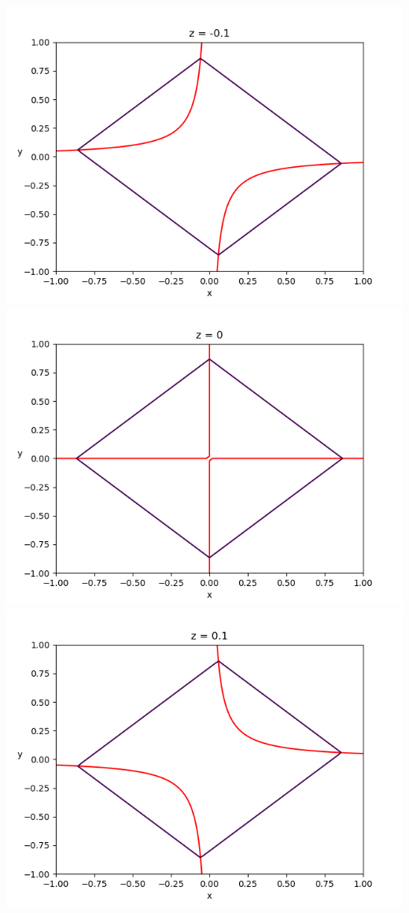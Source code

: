 \documentclass{article}
\begin{document}
\begin{enumerate}
\begin{center}
		\includegraphics[scale=.3]{hw7 level curves z = -0.1}
		\includegraphics[scale=.3]{hw7 level curves z = 0}
		\includegraphics[scale=.3]{hw7 level curves z = 0.1}

\end{center}
\end{enumerate}
\end{document}
